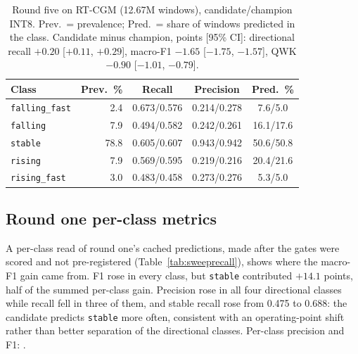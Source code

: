 \documentclass[10pt,twocolumn]{article}
\begin{document}
\begin{table}[!tp]
\centering
\caption{Round five on RT-CGM (12.67M windows), candidate/champion INT8.
Prev.\ = prevalence; Pred.\ = share of windows predicted in the class.
Candidate minus champion, points [95\% CI]: directional recall $+0.20$
[$+0.11$, $+0.29$], macro-F1 $-1.65$ [$-1.75$, $-1.57$], QWK $-0.90$
[$-1.01$, $-0.79$].}
\label{tab:rtcgmclass}
\footnotesize
\setlength{\tabcolsep}{3pt}
\begin{tabular}{@{}lrccc@{}}
\toprule
Class & Prev.\ \% & Recall & Precision & Pred.\ \% \\
\midrule
\texttt{falling\_fast} & 2.4 & 0.673/0.576 & 0.214/0.278 & 7.6/5.0 \\
\texttt{falling}       & 7.9 & 0.494/0.582 & 0.242/0.261 & 16.1/17.6 \\
\texttt{stable}        & 78.8 & 0.605/0.607 & 0.943/0.942 & 50.6/50.8 \\
\texttt{rising}        & 7.9 & 0.569/0.595 & 0.219/0.216 & 20.4/21.6 \\
\texttt{rising\_fast}  & 3.0 & 0.483/0.458 & 0.273/0.276 & 5.3/5.0 \\
\bottomrule
\end{tabular}
\end{table}

\subsection{Round one per-class metrics}

A per-class read of round one's cached predictions, made after the gates
were scored and not pre-registered (Table~\ref{tab:sweeprecall}), shows
where the macro-F1 gain came from. F1 rose in every class, but
\texttt{stable} contributed $+14.1$ points, half of the summed per-class
gain. Precision rose in all four directional classes while recall fell in
three of them, and stable recall rose from 0.475 to 0.688: the candidate
predicts \texttt{stable} more often, consistent with an operating-point
shift rather than better separation of the directional classes. Per-class
precision and F1: .
\end{document}
